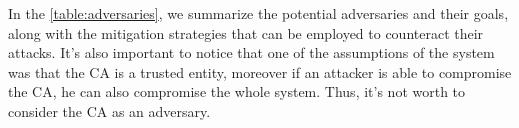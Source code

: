 In the \cref{table:adversaries}, we summarize the potential adversaries and their goals, along with the mitigation strategies that can be employed to counteract their attacks. It's also important to notice that one of the assumptions of the system was that the CA is a trusted entity, moreover if an attacker is able to compromise the CA, he can also compromise the whole system. Thus, it's not worth to consider the CA as an adversary.

